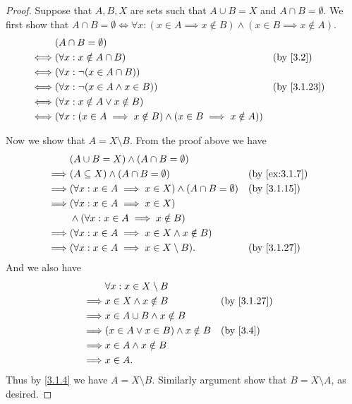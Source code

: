 \begin{proof}
	Suppose that \(A, B, X\) are sets such that \(A \cup B = X\) and \(A \cap B = \emptyset\).
	We first show that \(A \cap B = \emptyset \iff \forall x : (x \in A \implies x \notin B) \land (x \in B \implies x \notin A)\).
	\begin{align*}
		     & (A \cap B = \emptyset)                                                                           \\
		\iff & (\forall x : x \notin A \cap B)                                                 &  & \by{3.2}    \\
		\iff & (\forall x : \lnot (x \in A \cap B))                                                             \\
		\iff & (\forall x : \lnot (x \in A \land x \in B))                                     &  & \by{3.1.23} \\
		\iff & (\forall x : x \notin A \lor x \notin B)                                                         \\
		\iff & (\forall x : (x \in A \implies x \notin B) \land (x \in B \implies x \notin A))                  \\
	\end{align*}

	Now we show that \(A = X \setminus B\).
	From the proof above we have
	\begin{align*}
		         & (A \cup B = X) \land (A \cap B = \emptyset)                                            \\
		\implies & (A \subseteq X) \land (A \cap B = \emptyset)                        &  & \by{ex:3.1.7} \\
		\implies & (\forall x : x \in A \implies x \in X) \land (A \cap B = \emptyset) &  & \by{3.1.15}   \\
		\implies & (\forall x : x \in A \implies x \in X)                                                 \\
		         & \land (\forall x : x \in A \implies x \notin B)                                        \\
		\implies & (\forall x : x \in A \implies x \in X \land x \notin B)                                \\
		\implies & (\forall x : x \in A \implies x \in X \setminus B).                 &  & \by{3.1.27}
	\end{align*}
	And we also have
	\begin{align*}
		         & \forall x : x \in X \setminus B                          \\
		\implies & x \in X \land x \notin B                &  & \by{3.1.27} \\
		\implies & x \in A \cup B \land x \notin B                          \\
		\implies & (x \in A \lor x \in B) \land x \notin B &  & \by{3.4}    \\
		\implies & x \in A \land x \notin B                                 \\
		\implies & x \in A.
	\end{align*}
	Thus by \cref{3.1.4} we have \(A = X \setminus B\).
	Similarly argument show that \(B = X \setminus A\), as desired.
\end{proof}

